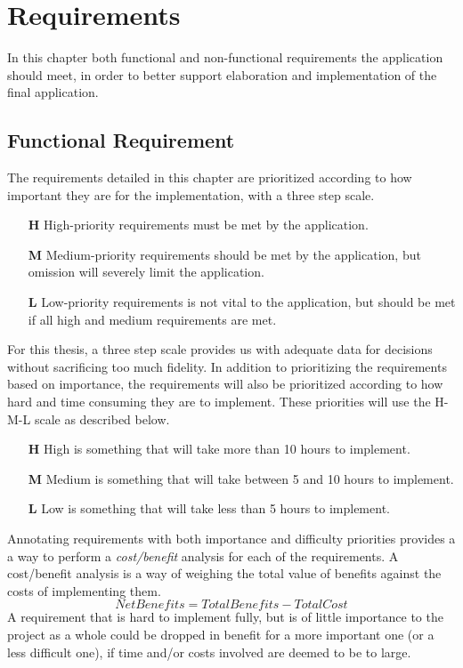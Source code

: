 \chapter{Requirements}
\label{cha:funcreq}
In this chapter both functional and non-functional requirements the application should meet, in order to better support elaboration and implementation of the final application. 
\section{Functional Requirement}
The requirements detailed in this chapter are prioritized according to how important they are for the implementation, with a three step scale. 

\vspace{0.5cm}
\begin{itemize}
    \item[\textbf{H}]{High-priority requirements must be met by the application.} 
    \item[\textbf{M}]{Medium-priority requirements should be met by the application, but omission will severely limit the application.}
    \item[\textbf{L}]{Low-priority requirements is not vital to the application, but should be met if all high and medium requirements are met.}
\end{itemize}
\vspace{0.5cm}

For this thesis, a three step scale provides us with adequate data for decisions without sacrificing too much fidelity.
In addition to prioritizing the requirements based on importance, the requirements will also be prioritized according to how hard and time consuming they are to implement. These priorities will use the H-M-L scale as described below. 

\vspace{0.5cm}
\begin{itemize}
    \item[\textbf{H}]{High is something that will take more than 10 hours to implement.}
    \item[\textbf{M}]{Medium is something that will take between 5 and 10 hours to implement.}
    \item[\textbf{L}]{Low is something that will take less than 5 hours to implement.}
\end{itemize}
\vspace{0.5cm}
Annotating requirements with both importance and difficulty priorities provides a a way to perform a \emph{cost/benefit} analysis for each of the requirements. A cost/benefit analysis is a way of weighing the total value of benefits against the costs of implementing them\cite{cellini2010cost}.
\begin{equation}
Net Benefits = Total Benefits - Total Cost
\end{equation}
A requirement that is hard to implement fully, but is of little importance to the project as a whole could be dropped in benefit for a more important one (or a less difficult one), if time and/or costs involved are deemed to be to large.

